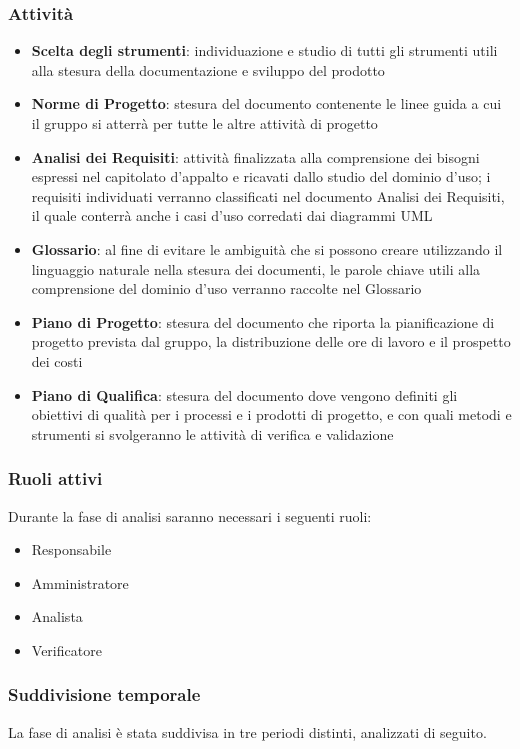 \subsubsection{Attività}
\begin{itemize}
	\item \textbf{Scelta degli strumenti}: individuazione e studio di tutti gli strumenti utili alla stesura della documentazione e sviluppo del prodotto
    \item \textbf{Norme di Progetto}: stesura del documento contenente le linee guida a cui il gruppo si atterrà per tutte le altre attività di progetto
    \item \textbf{Analisi dei Requisiti}: attività finalizzata alla comprensione dei bisogni espressi nel capitolato d’appalto e ricavati dallo studio del dominio d’uso; i requisiti individuati verranno classificati nel documento Analisi dei Requisiti, il quale conterrà anche i casi d’uso corredati dai diagrammi UML
    \item \textbf{Glossario}: al fine di evitare le ambiguità che si possono creare utilizzando il linguaggio naturale nella stesura dei documenti, le parole chiave utili alla comprensione del dominio d’uso verranno raccolte nel Glossario
    \item \textbf{Piano di Progetto}: stesura del documento che riporta la pianificazione di progetto prevista dal gruppo, la distribuzione delle ore di lavoro e il prospetto dei costi
    \item \textbf{Piano di Qualifica}: stesura del documento dove vengono definiti gli obiettivi di qualità per i processi e i prodotti di progetto, e con quali metodi e strumenti si svolgeranno le attività di verifica e validazione
\end{itemize}

\subsubsection{Ruoli attivi}
Durante la fase di analisi saranno necessari i seguenti ruoli:
\begin{itemize}
	\item Responsabile
    \item Amministratore
    \item Analista
    \item Verificatore
\end{itemize}

\subsubsection{Suddivisione temporale}
La fase di analisi è stata suddivisa in tre periodi distinti, analizzati di seguito.


